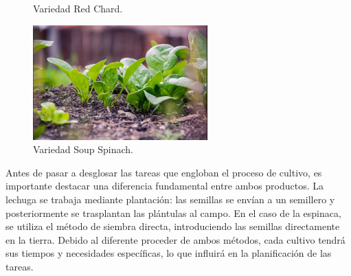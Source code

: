 \begin{figure}[ht!]
\begin{minipage}[b]{0.45\textwidth}
        \caption{Variedad Red Chard.}
        \label{fig:red}
    \end{minipage}
    \begin{minipage}[b]{0.45\textwidth}
        \centering
        \includegraphics[width=0.6\textwidth]{img/soup_spinach.png}
        \caption{Variedad Soup Spinach.}
        \label{fig:soup}
    \end{minipage}
\end{figure}

\newpage
Antes de pasar a desglosar las tareas que engloban el proceso de cultivo, es importante destacar una diferencia fundamental entre ambos productos.
La lechuga se trabaja mediante plantación: las semillas se envían a un semillero y posteriormente se trasplantan las plántulas al campo. 
En el caso de la espinaca, se utiliza el método de siembra directa, introduciendo las semillas directamente en la tierra.
Debido al diferente proceder de ambos métodos, cada cultivo tendrá sus tiempos y necesidades específicas, lo que influirá en la planificación de las tareas.

